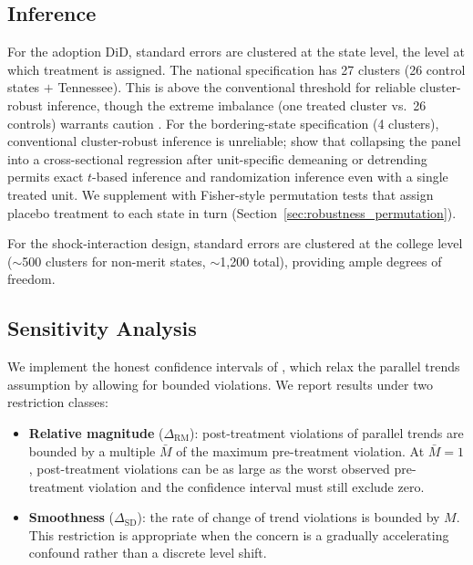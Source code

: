 \subsection{Inference}

For the adoption DiD, standard errors are clustered at the state level,
the level at which treatment is assigned. The national specification
has 27 clusters (26 control states $+$ Tennessee). This is above the
conventional threshold for reliable cluster-robust inference, though
the extreme imbalance (one treated cluster vs.\ 26 controls) warrants
caution \parencite{mackinnon2017wild}. For the bordering-state
specification (4 clusters), conventional cluster-robust inference is
unreliable; \textcite{lee2026simple} show that collapsing the panel
into a cross-sectional regression after unit-specific demeaning or
detrending permits exact $t$-based inference and randomization
inference even with a single treated unit. We supplement with
Fisher-style permutation tests that assign placebo treatment to each
state in turn (Section~\ref{sec:robustness_permutation}).

For the shock-interaction design, standard errors are clustered at the
college level ($\sim$500 clusters for non-merit states, $\sim$1,200
total), providing ample degrees of freedom.

\subsection{Sensitivity Analysis}

We implement the honest confidence intervals of
\textcite{rambachan2023more}, which relax the parallel trends assumption
by allowing for bounded violations. We report results under two
restriction classes:

\begin{itemize}
\item \textbf{Relative magnitude} ($\Delta_\text{RM}$): post-treatment
  violations of parallel trends are bounded by a multiple $\bar{M}$ of
  the maximum pre-treatment violation. At $\bar{M} = 1$, post-treatment
  violations can be as large as the worst observed pre-treatment
  violation and the confidence interval must still exclude zero.

\item \textbf{Smoothness} ($\Delta_\text{SD}$): the rate of change
  of trend violations is bounded by $M$. This restriction is
  appropriate when the concern is a gradually accelerating confound
  rather than a discrete level shift.
\end{itemize}

